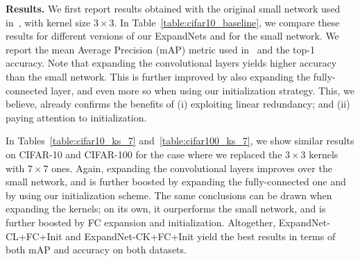 \documentclass[10pt,twocolumn,letterpaper]{article}
\begin{document}
\begin{table}[!t]
    \centering
    \vspace{0.01cm}
    \caption{\textbf{Small network with $3\times 3$ kernels vs ExpandNets on CIFAR-10.} Our approach yields consistently better results than the small network, particularly when expanding all layers and using our initialization strategy. }
  \label{table:cifar10_baseline}
\end{table}\vspace{0.2cm}\noindent\textbf{Results.}
We first report results obtained with the original small network used in~\cite{pkt_eccv}, with kernel size $3\times 3$.
In Table~\ref{table:cifar10_baseline}, we compare these results for different versions of our ExpandNets and for the small network. We report the mean Average Precision (mAP) metric used in~\cite{pkt_eccv} and the top-1 accuracy. Note that expanding the convolutional layers yields higher accuracy than the small network. This is further improved by also expanding the fully-connected layer, and even more so when using our initialization strategy. This, we believe, already confirms the benefits of (i) exploiting linear redundancy; and (ii) paying attention to initialization.

In Tables~\ref{table:cifar10_ks_7} and~\ref{table:cifar100_ks_7}, we show similar results on CIFAR-10 and CIFAR-100 for the case where we replaced the $3\times 3$ kernels with $7\times 7$ ones.
Again, expanding the convolutional layers improves over the small network, and is further boosted by expanding the fully-connected one and by using our initialization scheme. The same conclusions can be drawn when expanding the kernels; on its own, it ourperforms the small network, and is further boosted by FC expansion and initialization. Altogether, ExpandNet-CL+FC+Init  and ExpandNet-CK+FC+Init yield the best results in terms of both mAP and accuracy on both datasets.
\end{document}
